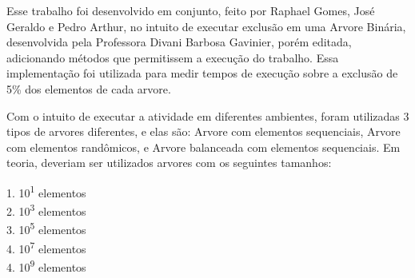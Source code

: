 \label{Introdução}

Esse trabalho foi desenvolvido em conjunto, feito por Raphael Gomes, José Geraldo e Pedro Arthur, no intuito de executar exclusão em uma Arvore Binária, desenvolvida pela Professora Divani Barbosa Gavinier\cite{divanibarbosa}, porém editada, adicionando métodos que permitissem a execução do trabalho. Essa implementação foi utilizada para medir tempos de execução sobre a exclusão de 5\% dos elementos de cada arvore.

Com o intuito de executar a atividade em diferentes ambientes, foram utilizadas 3 tipos de arvores diferentes, e elas são: Arvore com elementos sequenciais, Arvore com elementos randômicos, e Arvore balanceada com elementos sequenciais. Em teoria, deveriam ser utilizados arvores com os seguintes tamanhos:
        \begin{center}
        1. 10\textsuperscript{1} elementos\\ 
        2. 10\textsuperscript{3} elementos\\
        3. 10\textsuperscript{5} elementos\\ 
        4. 10\textsuperscript{7} elementos\\
        4. 10\textsuperscript{9} elementos
        \end{center}

